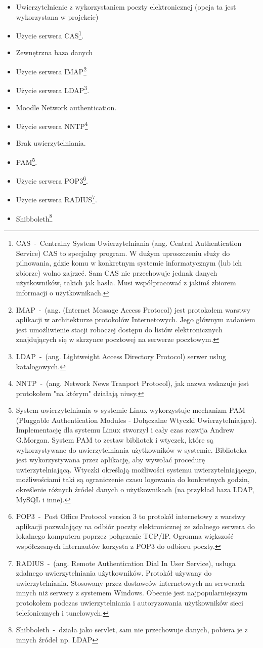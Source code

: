 \begin{itemize}
	\item Uwierzytelnienie z wykorzystaniem poczty elektronicznej (opcja ta jest wykorzystana w projekcie)
	\item Użycie serwera CAS\footnote{CAS~-~Centralny System Uwierzytelniania (ang. Central Authentication Service) CAS to specjalny program. W dużym uproszczeniu służy do pilnowania, gdzie komu w konkretnym systemie informatycznym (lub ich zbiorze) wolno zajrzeć. Sam CAS nie przechowuje jednak danych użytkowników, takich jak hasła. Musi współpracować z jakimś zbiorem informacji o użytkownikach.}.
	\item Zewnętrzna baza danych
	\item Użycie serwera IMAP\footnote{IMAP~-~(ang. (Internet Message Access Protocol) jest protokołem warstwy aplikacji w architekturze protokołów Internetowych. Jego głównym zadaniem jest umożliwienie stacji roboczej dostępu do listów elektronicznych znajdujących się w skrzynce pocztowej na serwerze pocztowym. }
	\item Użycie serwera LDAP\footnote{LDAP~-~(ang. Lightweight Access Directory Protocol) serwer usług katalogowych.}.
	\item Moodle Network authentication.
	\item Użycie serwera NNTP\footnote{NNTP~-~(ang. Network News Tranport Protocol), jak nazwa wskazuje jest protokołem "na którym" działają niusy.}
	\item Brak uwierzytelniania.
	\item PAM\footnote{System uwierzytelniania w systemie Linux wykorzystuje mechanizm PAM (Pluggable Authentication Modules - Dołączalne Wtyczki Uwierzytelniające). Implementację dla systemu Linux stworzył i cały czas rozwija Andrew G.Morgan. System PAM to zestaw bibliotek i wtyczek, które są wykorzystywane do uwierzytelniania użytkowników w systemie. Biblioteka jest wykorzystywana przez aplikację, aby wywołać procedurę uwierzytelniającą. Wtyczki określają możliwości systemu uwierzytelniającego, możliwościami taki są ograniczenie czasu logowania do konkretnych godzin, określenie różnych źródeł danych o użytkownikach (na przykład baza LDAP, MySQL i inne). }.
	\item Użycie serwera POP3\footnote{POP3~-~Post Office Protocol version 3 to protokół internetowy z warstwy aplikacji pozwalający na odbiór poczty elektronicznej ze zdalnego serwera do lokalnego komputera poprzez połączenie TCP/IP. Ogromna większość współczesnych internautów korzysta z POP3 do odbioru poczty.}.
	\item Użycie serwera RADIUS\footnote{RADIUS~-~(ang. Remote Authentication Dial In User Service), usługa zdalnego uwierzytelniania użytkowników. Protokół używany do uwierzytelniania. Stosowany przez dostawców internetowych na serwerach innych niż serwery z systemem Windows. Obecnie jest najpopularniejszym protokołem podczas uwierzytelniania i autoryzowania użytkowników sieci telefonicznych i tunelowych.}.
	\item Shibboleth\footnote{Shibboleth~-~działa jako servlet, sam nie przechowuje danych, pobiera je z innych źródeł np. LDAP}
\end{itemize}
